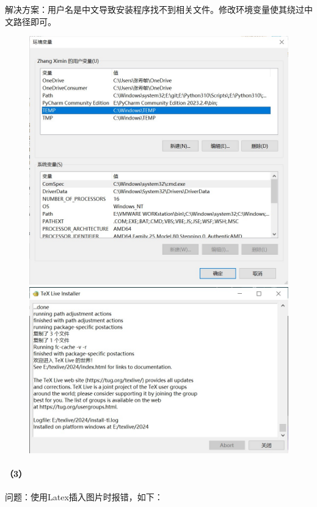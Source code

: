 \documentclass[a4paper, 12pt]{article}
\begin{document}
	解决方案：用户名是中文导致安装程序找不到相关文件。修改环境变量使其绕过中文路径即可。
	
	\begin{figure}[H]
		\centering
		\includegraphics[width=1\textwidth]{103.jpg}
		\includegraphics[width=1\textwidth]{104.jpg}
	\end{figure}
	
	\paragraph{（3）}
	问题：使用Latex插入图片时报错，如下：
	
\end{document}
